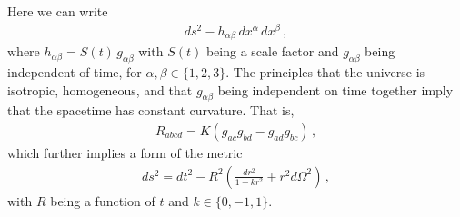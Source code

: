 \documentclass[11pt, onesided]{book}
\theoremstyle{break}
\theoremstyle{break}
\begin{document}
Here we can write
\begin{align*}
ds^2 - h_{\alpha\beta}\, dx^\alpha\, dx^\beta\,,
\end{align*}
where $h_{\alpha\beta} = S(t) \, g_{\alpha\beta}$ with $S(t)$ being a scale factor and $g_{\alpha\beta}$ being independent of time, for $\alpha,\beta \in \{1,2,3\}$. The principles that the universe is isotropic, homogeneous, and that $g_{\alpha\beta}$ being independent on time together imply that the spacetime has constant curvature. That is,
\begin{align*}
R_{abcd} = K (g_{ac}g_{bd} - g_{ad}g_{bc})\,,
\end{align*}
which further implies a form of the metric
\begin{align}
ds^2 = dt^2 - R^2 \left( \frac{dr^2}{1-kr^2} + r^2 d\Omega^2\right)\,,
\end{align}
with $R$ being a function of $t$ and $k \in \{0,-1,1\}$. \\
\end{document}
